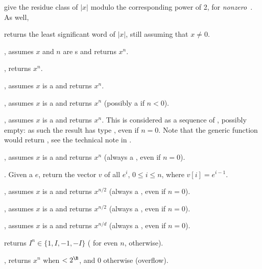 




 give the residue class of $|x|$ modulo the
corresponding power of 2, for \emph{nonzero}~. As well,

 returns the least significant word of $|x|$, still
assuming that $x\neq 0$.


, assumes $x$ and $n$ are s and
returns $x^n$.

, returns $x^n$.

, assumes $x$ is a  and returns $x^n$.

, assumes $x$ is a  and returns $x^n$
(possibly a  if $n < 0$).

, assumes $x$ is a  and returns
$x^n$. This is considered as a sequence of , possibly empty:
as such the result has type , even if $n = 0$.
Note that the generic function  would return ,
see the technical note in .

, assumes $x$ is a  and returns $x^n$
(always a , even if $n = 0$).

. Given a  $e$, return the vector
$v$ of all $e^i$, $0 \leq i \leq n$, where $v[i] = e^{i-1}$.

, assumes $x$ is a  and returns
$x^{n/2}$ (always a , even if $n = 0$).

, assumes $x$ is a  and returns
$x^{n/2}$ (always a , even if $n = 0$).

, assumes $x$ is a  and
returns $x^{n/d}$ (always a , even if $n = 0$).

 returns $I^n\in\{1,I,-1,-I\}$ ( for even $n$,
 otherwise).

, returns $x^n$ when $< 2^\B$, and $0$
otherwise (overflow).

